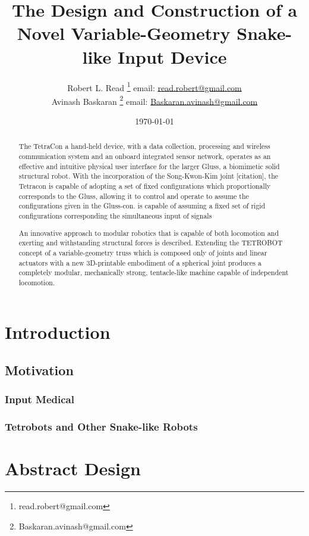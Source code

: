 \documentclass[11pt]{article}
\title{The Design and Construction of a Novel Variable-Geometry Snake-like Input Device}
\author{Robert L. Read
  \thanks{read.robert@gmail.com}
  email: \href{mailto:read.robert@gmail.com}{read.robert@gmail.com}\\
Avinash Baskaran
  \thanks{Baskaran.avinash@gmail.com}
  email: \href{mailto:Baskaran.avinash@gmail.com}{Baskaran.avinash@gmail.com}
  }
\affil{Public Invention, an educational non-profit.}
\date{\today}
\begin{document}
\maketitle


\begin{abstract}

  The TetraCon a hand-held device, with a data collection, processing and wireless
  communication system and an onboard integrated sensor network, operates as an
  effective and intuitive physical user interface for the larger Gluss, a biomimetic solid structural robot.
  With the incorporation of the Song-Kwon-Kim joint [citation], the
  Tetracon is capable of adopting a set of fixed configurations which proportionally corresponds to the Gluss, allowing it to control
  and operate to assume the configurations given in the Gluss-con. is capable of assuming a fixed set of rigid configurations
  corresponding the simultaneous input of signals


  An innovative approach to modular robotics that is capable of both locomotion and exerting and
  withstanding structural forces is described.
  Extending the TETROBOT\cite{sanderson1996modular,lee2002dynamic,lee1999dynamics,TetrobotBook}
  concept of a variable-geometry
  truss which is composed only of joints and linear actuators
  with a new 3D-printable embodiment of a
  spherical joint\cite{song2003spherical}
  produces a completely modular, mechanically strong, tentacle-like machine capable of independent locomotion.
\end{abstract}


\section{Introduction}

\subsection{Motivation}
\subsubsection{Input Medical}
\subsubsection{Tetrobots and Other Snake-like Robots}

\section{Abstract Design}
\end{document}
